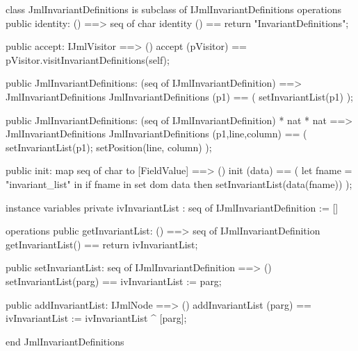 \begin{vdm_al}
class JmlInvariantDefinitions is subclass of IJmlInvariantDefinitions
operations
  public identity: () ==> seq of char
  identity () == return "InvariantDefinitions";

  public accept: IJmlVisitor ==> ()
  accept (pVisitor) == pVisitor.visitInvariantDefinitions(self);

  public JmlInvariantDefinitions:
    (seq of IJmlInvariantDefinition) ==> JmlInvariantDefinitions
  JmlInvariantDefinitions (p1) == 
    ( setInvariantList(p1) );

  public JmlInvariantDefinitions:
    (seq of IJmlInvariantDefinition) *
    nat *
    nat ==> JmlInvariantDefinitions
  JmlInvariantDefinitions (p1,line,column) == 
    ( setInvariantList(p1);
      setPosition(line, column) );

  public init: map seq of char to [FieldValue] ==> ()
  init (data) ==
    ( let fname = "invariant_list" in
        if fname in set dom data
        then setInvariantList(data(fname)) );

instance variables
  private ivInvariantList : seq of IJmlInvariantDefinition := []

operations
  public getInvariantList: () ==> seq of IJmlInvariantDefinition
  getInvariantList() == return ivInvariantList;

  public setInvariantList: seq of IJmlInvariantDefinition ==> ()
  setInvariantList(parg) == ivInvariantList := parg;

  public addInvariantList: IJmlNode ==> ()
  addInvariantList (parg) == ivInvariantList := ivInvariantList ^ [parg];

end JmlInvariantDefinitions
\end{vdm_al}

